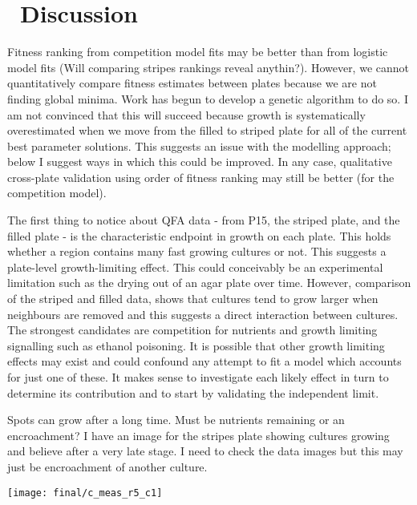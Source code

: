 \graphicspath{{images/}}

\section{\thesection~Discussion}
\label{sec:discussion}

Fitness ranking from competition model fits may be better than from
logistic model fits (Will comparing stripes rankings reveal
anythin?). However, we cannot quantitatively compare fitness estimates
between plates because we are not finding global minima. Work has
begun to develop a genetic algorithm to do so. I am not convinced that
this will succeed because growth is systematically overestimated when
we move from the filled to striped plate for all of the current best
parameter solutions. This suggests an issue with the modelling
approach; below I suggest ways in which this could be improved. In
any case, qualitative cross-plate validation using order of fitness
ranking may still be better (for the competition model).

The first thing to notice about QFA data - from P15, the striped
plate, and the filled plate - is the characteristic endpoint in growth
on each plate. This holds whether a region contains many fast growing
cultures or not. This suggests a plate-level growth-limiting
effect. This could conceivably be an experimental limitation such as
the drying out of an agar plate over time. However, comparison of the
striped and filled data, shows that cultures tend to grow larger when
neighbours are removed and this suggests a direct interaction between
cultures. The strongest candidates are competition for nutrients and
growth limiting signalling such as ethanol poisoning. It is possible
that other growth limiting effects may exist and could confound any
attempt to fit a model which accounts for just one of these. It makes
sense to investigate each likely effect in turn to determine its
contribution and to start by validating the independent limit.



Spots can grow after a long time. Must be nutrients remaining or an
encroachment? I have an image for the stripes plate showing cultures
growing and believe after a very late stage. I need to check the data
images but this may just be encroachment of another culture.
\graphicspath{{images/stripes/}}
\begin{Figure}
  \centering
  \texttt{[image: final/c\_meas\_r5\_c1]}
  \label{fig:kn_guessing}
\end{Figure}


